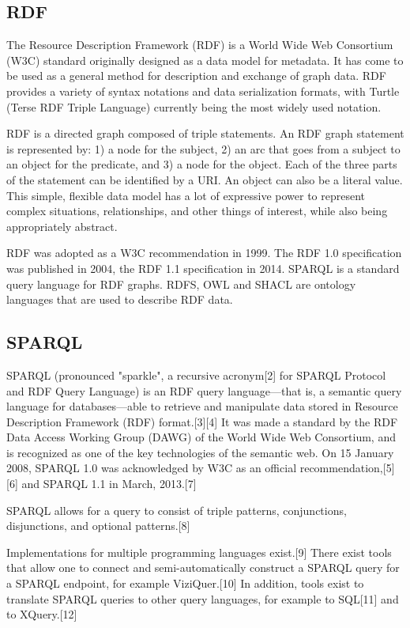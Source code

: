 \subsection*{RDF}
The Resource Description Framework (RDF) is a World Wide Web Consortium (W3C) standard originally designed as a data model for metadata. It has come to be used as a general method for description and exchange of graph data. RDF provides a variety of syntax notations and data serialization formats, with Turtle (Terse RDF Triple Language) currently being the most widely used notation.

RDF is a directed graph composed of triple statements. An RDF graph statement is represented by: 1) a node for the subject, 2) an arc that goes from a subject to an object for the predicate, and 3) a node for the object. Each of the three parts of the statement can be identified by a URI. An object can also be a literal value. This simple, flexible data model has a lot of expressive power to represent complex situations, relationships, and other things of interest, while also being appropriately abstract.

RDF was adopted as a W3C recommendation in 1999. The RDF 1.0 specification was published in 2004, the RDF 1.1 specification in 2014. SPARQL is a standard query language for RDF graphs. RDFS, OWL and SHACL are ontology languages that are used to describe RDF data.

\subsection*{SPARQL}
SPARQL (pronounced "sparkle", a recursive acronym[2] for SPARQL Protocol and RDF Query Language) is an RDF query language—that is, a semantic query language for databases—able to retrieve and manipulate data stored in Resource Description Framework (RDF) format.[3][4] It was made a standard by the RDF Data Access Working Group (DAWG) of the World Wide Web Consortium, and is recognized as one of the key technologies of the semantic web. On 15 January 2008, SPARQL 1.0 was acknowledged by W3C as an official recommendation,[5][6] and SPARQL 1.1 in March, 2013.[7]

SPARQL allows for a query to consist of triple patterns, conjunctions, disjunctions, and optional patterns.[8]

Implementations for multiple programming languages exist.[9] There exist tools that allow one to connect and semi-automatically construct a SPARQL query for a SPARQL endpoint, for example ViziQuer.[10] In addition, tools exist to translate SPARQL queries to other query languages, for example to SQL[11] and to XQuery.[12]

